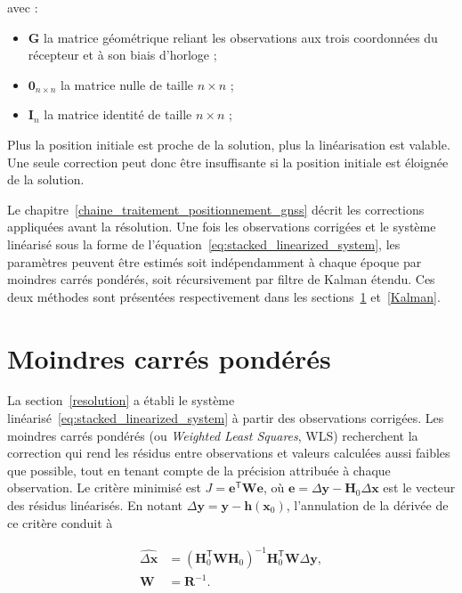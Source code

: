 avec :

\begin{itemize}
    \item $\mathbf G$ la matrice géométrique reliant les observations aux
    trois coordonnées du récepteur et à son biais d'horloge ;
    \item $\mathbf 0_{n\times n}$ la matrice nulle de taille $n\times n$ ;
    \item $\mathbf I_n$ la matrice identité de taille $n\times n$ ;
\end{itemize}

Plus la position initiale est proche de la solution, plus la linéarisation est valable. Une seule correction peut donc être insuffisante si la
position initiale est éloignée de la solution.

Le chapitre~\ref{chaine_traitement_positionnement_gnss} décrit les corrections
appliquées avant la résolution. Une fois les observations corrigées et le
système linéarisé sous la forme de l'équation~\eqref{eq:stacked_linearized_system},
les paramètres peuvent être estimés soit indépendamment à chaque époque par
moindres carrés pondérés, soit récursivement par filtre de Kalman étendu. Ces
deux méthodes sont présentées respectivement dans les
sections~\ref{sec:wls} et~\ref{Kalman}.

\section{Moindres carrés pondérés}
\label{sec:wls}

La section~\ref{resolution} a établi le système
linéarisé~\eqref{eq:stacked_linearized_system} à partir des observations
corrigées. Les moindres carrés pondérés (ou \textit{Weighted Least Squares}, WLS) recherchent la correction qui rend les résidus
entre observations et valeurs calculées aussi faibles que possible, tout en
tenant compte de la précision attribuée à chaque observation. Le critère
minimisé est $J=\mathbf e^{\mathsf T}\mathbf W\mathbf e$, où
$\mathbf e=\Delta\mathbf y-\mathbf H_0\Delta\mathbf x$ est le vecteur des
résidus linéarisés. En notant
$\Delta\mathbf y=\mathbf y-\mathbf h(\mathbf x_0)$, l'annulation de la dérivée
de ce critère conduit à

\begin{align}
\widehat{\Delta\mathbf x}
&=
\left(\mathbf H_0^{\mathsf T}\mathbf W\mathbf H_0\right)^{-1}
\mathbf H_0^{\mathsf T}\mathbf W\Delta\mathbf y,
\\
\mathbf W
&=
\mathbf R^{-1}.
\label{eq:wls_solution}
\end{align}

